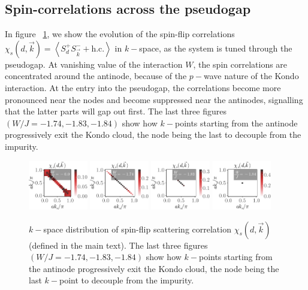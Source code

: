 \documentclass[reprint,hidelinks,onecolumn]{revtex4-2}
\begin{document}
\subsection{Spin-correlations across the pseudogap}
In figure ~\ref{spinCorr}, we show the evolution of the spin-flip correlations \(\chi_s(d,\vec k) = \left<S_d^+ S_{\vec k}^- + \text{h.c.}\right>\) in \(k-\)space, as the system is tuned through the pseudogap. At vanishing value of the interaction \(W\), the spin correlations are concentrated around the antinode, because of the \(p-\)wave nature of the Kondo interaction. At the entry into the pseudogap, the correlations become more pronounced near the nodes and become suppressed near the antinodes, signalling that the latter parts will gap out first. The last three figures \((W/J=-1.74, -1.83, -1.84)\) show how \(k-\)points starting from the antinode progressively exit the Kondo cloud, the node being the last to decouple from the impurity.

\begin{figure}[htpb]
	\centering
	\includegraphics[width=0.23\textwidth]{SF-1.pdf}
	\includegraphics[width=0.23\textwidth]{SF-3.pdf}
	\includegraphics[width=0.23\textwidth]{SF-5.pdf}
	\includegraphics[width=0.23\textwidth]{SF-6.pdf}
	\caption{\(k-\)space distribution of spin-flip scattering correlation \(\chi_s(d,\vec k)\) (defined in the main text). The last three figures \((W/J=-1.74, -1.83, -1.84)\) show how \(k-\)points starting from the antinode progressively exit the Kondo cloud, the node being the last \(k-\)point to decouple from the impurity.}
	\label{spinCorr}
\end{figure}
\end{document}
